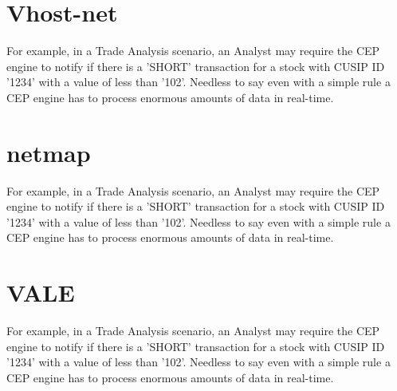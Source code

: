 \section{Vhost-net}
For example, in a Trade Analysis scenario, an Analyst may require the CEP engine to notify if there is a 'SHORT' transaction for a stock with CUSIP ID '1234' with a value of less than '102'. Needless to say even with a simple rule a CEP engine has to process enormous amounts of data in real-time.
\section{netmap}
For example, in a Trade Analysis scenario, an Analyst may require the CEP engine to notify if there is a 'SHORT' transaction for a stock with CUSIP ID '1234' with a value of less than '102'. Needless to say even with a simple rule a CEP engine has to process enormous amounts of data in real-time.
\section{VALE}
For example, in a Trade Analysis scenario, an Analyst may require the CEP engine to notify if there is a 'SHORT' transaction for a stock with CUSIP ID '1234' with a value of less than '102'. Needless to say even with a simple rule a CEP engine has to process enormous amounts of data in real-time.


